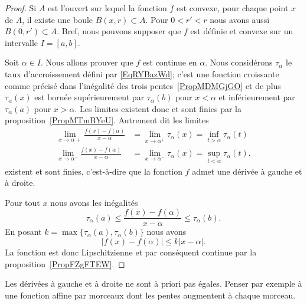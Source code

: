 \begin{proof}
	Si \( A\) est l'ouvert sur lequel la fonction \( f\) est convexe, pour chaque point \( x\) de \( A\), il existe une boule \( B(x,r)\subset A\). Pour \( 0<r'<r\) nous avons aussi \( \overline{B(0,r')}\subset A\). Bref, nous pouvons supposer que \( f\) est définie et convexe sur un intervalle \( I=[a ,b]\).

	Soit \( \alpha\in I\). Nous allons prouver que \( f\) est continue en \( \alpha\). Nous considérons \( \tau_{\alpha}\) le taux d'accroissement défini par \eqref{EqRYBazWd}; c'est une fonction croissante comme précisé dans l'inégalité des trois pentes~\ref{PropMDMGjGO} et de plus \( \tau_{\alpha}(x)\) est bornée supérieurement par \( \tau_{\alpha}(b)\) pour \( x<\alpha\) et inférieurement par \( \tau_{\alpha}(a)\) pour \( x>\alpha\). Les limites existent donc et sont finies par la proposition~\ref{PropMTmBYeU}. Autrement dit les limites
	\begin{subequations}
		\begin{align}
			\lim_{x\to \alpha+} \frac{ f(x)-f(\alpha) }{ x-\alpha }  & =\lim_{x\to \alpha^+} \tau_{\alpha}(x)=\inf_{t>\alpha}\tau_{\alpha}(t)  \\
			\lim_{x\to \alpha^-} \frac{ f(x)-f(\alpha) }{ x-\alpha } & =\lim_{x\to \alpha^-} \tau_{\alpha}(x)=\sup_{t<\alpha}\tau_{\alpha}(t).
		\end{align}
	\end{subequations}
	existent et sont finies, c'est-à-dire que la fonction \( f\) admet une dérivée à gauche et à droite.

	Pour tout \( x\) nous avons les inégalités
	\begin{equation}
		\tau_{\alpha}(a)\leq \frac{ f(x)-f(\alpha) }{ x-\alpha }\leq \tau_{\alpha}(b).
	\end{equation}
	En posant \( k=\max\{ \tau_{\alpha}(a),\tau_{\alpha}(b) \}\) nous avons
	\begin{equation}
		\big| f(x)-f(\alpha) \big|\leq k| x-\alpha |.
	\end{equation}
	La fonction est donc Lipschitzienne et par conséquent continue par la proposition~\ref{PropFZgFTEW}.
\end{proof}

\begin{remark}
	Les dérivées à gauche et à droite ne sont à priori pas égales. Penser par exemple à une fonction affine par morceaux dont les pentes augmentent à chaque morceau.
\end{remark}

